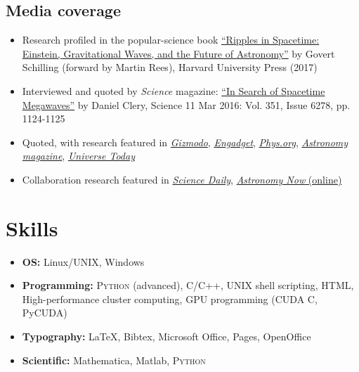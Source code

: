 \documentclass[11pt,letterpaper,sans]{moderncv}
\begin{document}
\subsection{Media coverage}
\begin{itemize}[leftmargin=8mm]
\item Research profiled in the popular-science book {\color{color1} \href{https://books.google.com/books/about/Ripples_in_Spacetime.html?id=YicuDwAAQBAJ&hl=en}{``Ripples in Spacetime: Einstein, Gravitational Waves, and the Future of Astronomy''}} by Govert Schilling (forward by Martin Rees), Harvard University Press (2017)
\item Interviewed and quoted by \textit{Science} magazine: {\color{color1} \href{http://science.sciencemag.org/content/351/6278/1124}{``In Search of Spacetime Megawaves''}} by Daniel Clery, Science  11 Mar 2016: Vol. 351, Issue 6278, pp. 1124-1125
\item Quoted, with research featured in {\color{color1} \href{http://gizmodo.com/we-could-find-even-more-gravitational-waves-soon-with-p-1761021828}{\textit{Gizmodo}}}, {\color{color1} \href{https://www.engadget.com/2016/02/25/pulsars-gravitational-waves-black-holes/}{\textit{Engadget}}}, {\color{color1} \href{http://phys.org/news/2016-02-pulsar-web-low-frequency-gravitational.html}{\textit{Phys.org}}},  {\color{color1} \href{http://www.astronomy.com/news/2016/02/pulsar-web-could-detect-gravitational-waves}{\textit{Astronomy magazine}}}, {\color{color1} \href{http://www.universetoday.com/127562/the-future-of-gravitational-wave-astronomy-enhanced-ligo-pulsar-webs-space-interferometers-and-everything/}{\textit{Universe Today}}}
\item Collaboration research featured in {\color{color1} \href{https://www.sciencedaily.com/releases/2016/04/160405122609.htm}{\textit{Science Daily}}}, {\color{color1} \href{https://astronomynow.com/2016/04/06/gravitational-wave-search-provides-insights-into-galaxy-mergers/}{\textit{Astronomy Now} (online)}}
\end{itemize}

\section{Skills}
\begin{itemize}[leftmargin=8mm]
\item \textbf{OS:} Linux/UNIX, Windows
\item \textbf{Programming:} \textsc{Python} (advanced), C/C++, UNIX shell scripting, HTML, High-performance cluster computing, GPU programming (CUDA C, PyCUDA)
\item \textbf{Typography:} \LaTeX, Bibtex, Microsoft Office, Pages, OpenOffice 
\item \textbf{Scientific:} Mathematica, Matlab, \textsc{Python}
\end{itemize}
\end{document}
